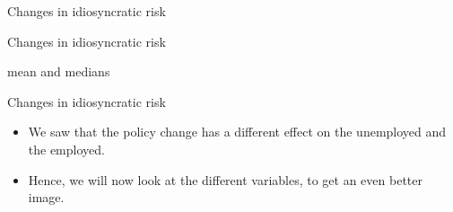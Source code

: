 \documentclass{beamer}
\begin{document}
\begin{frame}{Changes in idiosyncratic risk}

\end{frame}

\begin{frame}{Changes in idiosyncratic risk}

mean and medians

\end{frame}



\begin{frame}{Changes in idiosyncratic risk}

\begin{itemize} 
	\item {
We saw that the policy change has a different effect on the unemployed and the employed. 
}
	\item {
Hence, we will now look at the different variables, to get an even better image.
}
\end{itemize}


\end{frame}
\end{document}

